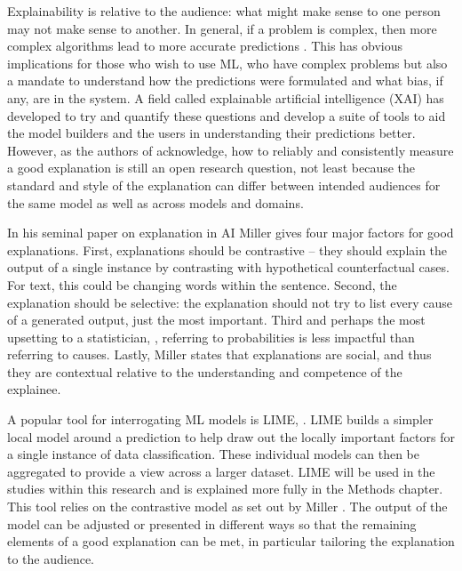 Explainability is relative to the audience: what might make sense to one person may not make sense to another. In general, if a problem is complex, then more complex algorithms lead to more accurate predictions  \parencite{arrieta2020explainable}. This has obvious implications for those who wish to use ML, who have complex problems but also a mandate to understand how the predictions were formulated and what bias, if any, are in the system. A field called explainable artificial intelligence (XAI)  \parencite{gunning2019xai} has developed to try and quantify these questions and develop a suite of tools to aid the model builders and the users in understanding their predictions better. However, as the authors of  \textcite{gunning2019xai}  acknowledge, how to reliably and consistently measure a good explanation is still an open research question, not least because the standard and style of the explanation can differ between intended audiences for the same model as well as across models and domains.

In his seminal paper on explanation in AI \parencite{miller2019explanation} Miller gives four major factors for good explanations. First, explanations should be contrastive – they should explain the output of a single instance by contrasting with hypothetical counterfactual cases. For text, this could be changing words within the sentence. Second, the explanation should be selective: the explanation should not try to list every cause of a generated output, just the most important. Third and perhaps the most upsetting to a statistician,   , referring to probabilities is less impactful than referring to causes. Lastly, Miller states that explanations are social, and thus they are contextual relative to the understanding and competence of the explainee.

A popular tool  for interrogating ML models is LIME, \parencite{ribeiro2016should}. LIME  builds a simpler local model around a prediction to help draw out the locally important factors for a single instance of data classification. These individual models can then be aggregated to provide a view across a larger dataset.  LIME will be used in the studies within this research and is explained more fully in the Methods chapter. This tool relies on the contrastive model as set out by Miller \parencite{miller2019explanation}. The output of the model can be adjusted or presented in different ways so that the remaining elements of a good explanation can be met, in particular tailoring the explanation to the audience.

